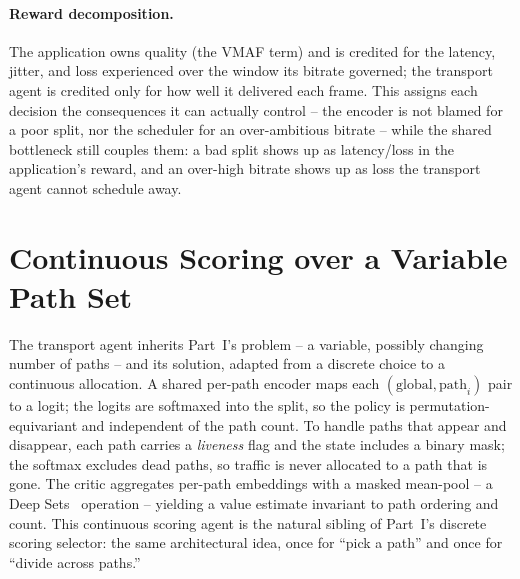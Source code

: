 \paragraph{Reward decomposition.} The application owns quality (the VMAF term) and is credited for the
latency, jitter, and loss experienced over the window its bitrate governed; the transport agent is
credited only for how well it delivered each frame. This assigns each decision the consequences it can
actually control -- the encoder is not blamed for a poor split, nor the scheduler for an over-ambitious
bitrate -- while the shared bottleneck still couples them: a bad split shows up as latency/loss in the
application's reward, and an over-high bitrate shows up as loss the transport agent cannot schedule away.

\section{Continuous Scoring over a Variable Path Set}
\label{sec:p2design:scoring}

The transport agent inherits Part~I's problem -- a variable, possibly changing number of paths -- and its
solution, adapted from a discrete choice to a continuous allocation. A shared per-path encoder maps each
$(\text{global}, \text{path}_i)$ pair to a logit; the logits are softmaxed into the split, so the policy
is permutation-equivariant and independent of the path count. To handle paths that appear and disappear,
each path carries a \emph{liveness} flag and the state includes a binary mask; the softmax excludes dead
paths, so traffic is never allocated to a path that is gone. The critic aggregates per-path embeddings
with a masked mean-pool -- a Deep Sets~\cite{Zaheer2017} operation -- yielding a value estimate invariant
to path ordering and count. This continuous scoring agent is the natural sibling of Part~I's discrete
scoring selector: the same architectural idea, once for ``pick a path'' and once for ``divide across
paths.''
